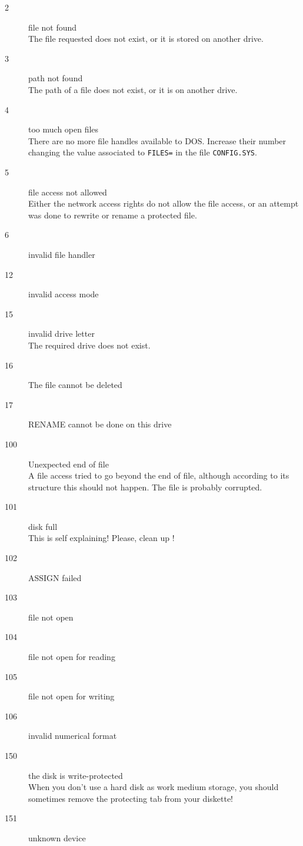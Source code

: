 \documentclass[12pt,twoside]{report}
\newcommand{\tty}[1]{{\tt #1}}
\begin{document}
\begin{description}
\item[2]{file not found\\
         The file requested does not exist, or it is stored on another
         drive.}
\item[3]{path not found\\
         The path of a file does not exist, or it is on another drive.}
\item[4]{too much open files\\
         There are no more file handles available to DOS. Increase
         their number changing the value associated to \tty{FILES=} in the file
         \tty{CONFIG.SYS}.}
\item[5]{file access not allowed\\
         Either the network access rights do not allow the file access, or
         an attempt was done to rewrite or rename a protected file.}
\item[6]{invalid file handler}
\item[12]{invalid access mode}
\item[15]{invalid drive letter\\
         The required drive does not exist.}
\item[16]{The file cannot be deleted}
\item[17]{RENAME cannot be done on this drive}
\item[100]{Unexpected end of file\\
         A file access tried to go beyond the end of file, although according
         to its structure this should not happen. The file is probably
         corrupted.}
\item[101]{disk full\\
         This is self explaining! Please, clean up !}
\item[102]{ASSIGN failed}
\item[103]{file not open}
\item[104]{file not open for reading}
\item[105]{file not open for writing}
\item[106]{invalid numerical format}
\item[150]{the disk is write-protected\\
         When you don't use a hard disk as work medium storage, you should
         sometimes remove the protecting tab from your diskette!}
\item[151]{unknown device\\
}
\end{description}
\end{document}
